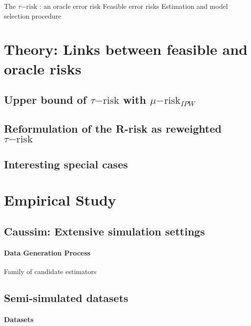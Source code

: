 \documentclass{report}
\begin{document}
The $\tau\mathrm{-risk}$ : an oracle error risk
Feasible error risks
Estimation and model selection procedure
\section{Theory: Links between feasible and oracle risks}\label{sec:causal_model_selection:theory}

\subsection{Upper bound of $\tau\mathrm{-risk}$ with
  $\mu\mathrm{-risk}_{IPW}$}\label{subsec:causal_model_selection:upper_bound}

\subsection{Reformulation of the R-risk as reweighted
  $\tau\mathrm{-risk}$}\label{subsec:causal_model_selection:r_risk_reformulation}

\subsection{Interesting special
  cases}\label{subsec:causal_model_selection:special_cases}

\section{Empirical Study}\label{sec:causal_model_selection:empirical_study}

\subsection{Caussim: Extensive simulation settings}\label{subsec:causal_model_selection:caussim}
\paragraph{Data Generation Process}

Family of candidate estimators

\subsection{Semi-simulated datasets}\label{subsec:causal_model_selection:semi_simulated}
\paragraph{Datasets}
\end{document}
